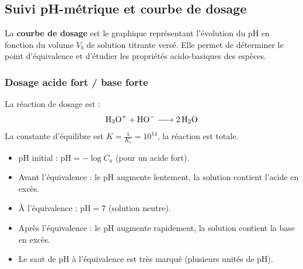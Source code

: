 \subsection{Suivi pH-métrique et courbe de dosage}

\begin{definition}
La \textbf{courbe de dosage} est le graphique représentant l'évolution du pH en fonction du volume $V_b$ de solution titrante versé. Elle permet de déterminer le point d'équivalence et d'étudier les propriétés acido-basiques des espèces.
\end{definition}

\subsubsection{Dosage acide fort / base forte}

\begin{experience}
La réaction de dosage est :
\[\ce{H3O+ + HO- -> 2 H2O}\]
La constante d'équilibre est $K = \frac{1}{K_e} = 10^{14}$, la réaction est totale.
\end{experience}

\begin{propriete}
\begin{itemize}
    \item pH initial : $\mathrm{pH} = -\log C_a$ (pour un acide fort).
    \item Avant l'équivalence : le pH augmente lentement, la solution contient l'acide en excès.
    \item À l'équivalence : $\mathrm{pH} = 7$ (solution neutre).
    \item Après l'équivalence : le pH augmente rapidement, la solution contient la base en excès.
    \item Le saut de pH à l'équivalence est très marqué (plusieurs unités de pH).
\end{itemize}
\end{propriete}

\begin{illus}
\end{illus}

